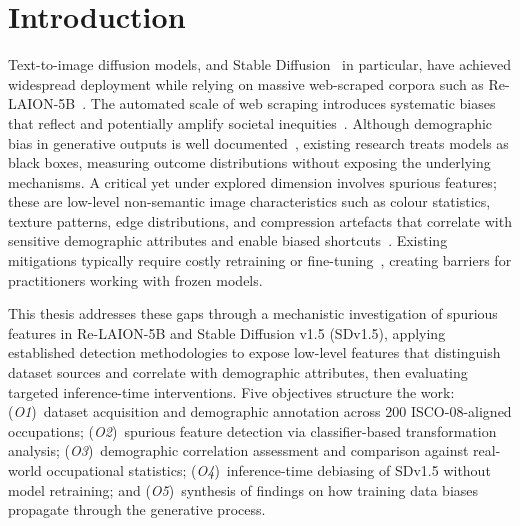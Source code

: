 \section{Introduction}

Text-to-image diffusion models, and Stable Diffusion~\cite{Rombach_2022_CVPR} in
particular, have achieved widespread deployment while relying on massive web-scraped
corpora such as Re-LAION-5B~\cite{Schuhmann_2022_Laion5b}. The automated scale of web scraping
introduces systematic biases that reflect and potentially amplify societal
inequities~\cite{Birhane_2021_MultiModalDatasetsMisogynyPornography}. Although
demographic bias in generative outputs is well documented~\cite{Luccioni_2023_AnalyzingSocietalRepresentationsDiffusionModels, Bianchi_2023_TTIGenAmplifiesDemographicStereotypes}, existing research treats models
as black boxes, measuring outcome distributions without exposing the underlying
mechanisms. A critical yet under explored dimension involves spurious features; these are low-level non-semantic image characteristics such as colour statistics, texture patterns, edge distributions, and compression artefacts that correlate
with sensitive demographic attributes and enable biased shortcuts~\cite{Meister_2023_GenderArtifactsinVisualDatasets, Zeng_2024_UnderstandingBiasinLargeScaleVisualDatasets}. Existing mitigations typically require costly retraining or fine-tuning~\cite{Friedrich_2023_FairDiffusionInstructingTextToImage}, creating barriers for practitioners working with frozen models.

This thesis addresses these gaps through a mechanistic investigation of spurious
features in Re-LAION-5B and Stable Diffusion v1.5 (SDv1.5), applying established
detection methodologies to expose low-level features that distinguish dataset sources
and correlate with demographic attributes, then evaluating targeted inference-time
interventions. Five objectives structure the work: (\textit{O1})~dataset acquisition
and demographic annotation across 200 ISCO-08-aligned occupations;
(\textit{O2})~spurious feature detection via classifier-based transformation
analysis; (\textit{O3})~demographic correlation assessment and comparison against
real-world occupational statistics; (\textit{O4})~inference-time debiasing of
SDv1.5 without model retraining; and (\textit{O5})~synthesis of findings on how
training data biases propagate through the generative process.
